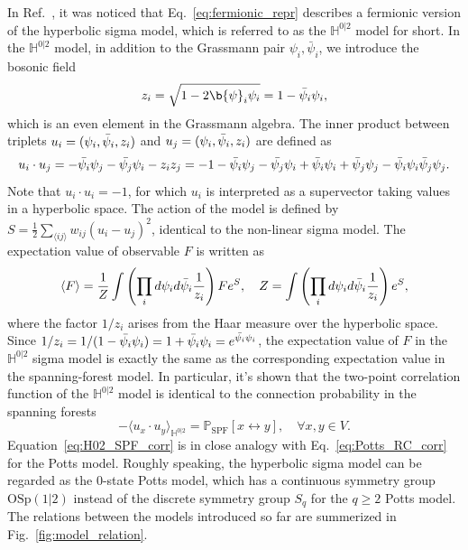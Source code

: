 In Ref.~, it was noticed that Eq.~\eqref{eq:fermionic_repr} describes a fermionic version of the hyperbolic sigma model, which 
is referred to as the $\mathbb{H}^{0|2}$ model for short. In the $\mathbb{H}^{0|2}$ model, in addition to the Grassmann pair $\psi_i, \bar{\psi}_i$, we introduce
the bosonic field
\begin{equation}
	z_i = \sqrt{1 - 2\b{\psi}_i\psi_i} = 1-\bar{\p}_i\p_i,
\end{equation}
which is an even element in the Grassmann algebra. The inner product between triplets $u_i = ({\psi}_i, \bar{{\psi}}_i, z_i)$ and 
$u_j = ({\psi}_i, \bar{{\psi}}_i, z_i)$ are defined as
\begin{equation}
	u_i \cdot u_j = -\bar{{\psi}_i}{\psi}_j - \bar{{\psi}_j}{\psi}_i - z_i z_j = -1 - \bar{{\psi}_i}{\psi}_j - \bar{{\psi}_j}{\psi}_i + \bar{{\psi}}_i{\psi}_i + \bar{{\psi}}_j{\psi}_j
	-\bar{{\psi}}_i{\psi}_i\bar{{\psi}}_j{\psi}_j.
\end{equation}
Note that $u_i \cdot u_i = -1$, for which $u_i$ is interpreted as a supervector taking values in a hyperbolic space. 
The action of the model is defined by $S = \frac{1}{2}\sum_{\langle ij \rangle} w_{ij}(u_i - u_j)^2$, identical to the non-linear sigma model.
The expectation value of observable $F$ is written as
\begin{equation}
	\langle F \rangle = \frac{1}{Z} \int \left(\prod_{i}d{\psi}_i d\bar{{\psi}}_i \frac{1}{z_i}\right) F e^S,
	\quad Z = \int \left(\prod_{i}d{\psi}_i d\bar{{\psi}}_i \frac{1}{z_i}\right) e^S,
\end{equation}
where the factor $1/z_i$ arises from the Haar measure over the hyperbolic space. Since $1/z_i = 1/(1-\bar{{\psi}_i}{\psi}_i) = 1 + \bar{{\psi}_i}{\psi}_i = e^{\bar{{\psi}_i}{\psi}_i}$,
the expectation value of $F$ in the $\mathbb{H}^{0|2}$ sigma model is exactly the same as the corresponding expectation value in the spanning-forest model.
In particular, it's shown that the two-point correlation function of the $\mathbb{H}^{0|2}$ model is identical to the connection probability 
in the spanning forests
\begin{equation}\label{eq:H02_SPF_corr}
-\langle u_x \cdot u_y \rangle_{\mathbb{H}^{0|2}} = \mathbb{P}_{\text{SPF}}[x \leftrightarrow y], \quad \forall x, y \in V.
\end{equation}
Equation~\eqref{eq:H02_SPF_corr} is in close analogy with Eq.~\eqref{eq:Potts_RC_corr} for the Potts model. Roughly speaking,
the hyperbolic sigma model can be regarded as the $0$-state Potts model, which has a continuous symmetry group $\text{OSp}(1|2)$
instead of the discrete symmetry group $S_q$ for the $q\geq2$ Potts model. The relations between the models introduced so far 
are summerized in Fig.~\ref{fig:model_relation}.

